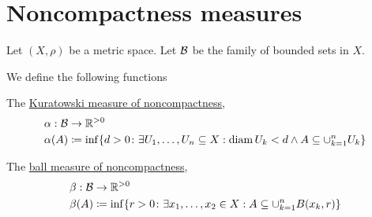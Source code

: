 \section{Noncompactness measures}\label{sec:noncompactness_measures}

Let $(X, \rho)$ be a metric space. Let $\mathcal B$ be the family of bounded sets in $X$.

\begin{definition}\label{def:noncompactness_measures}\cite[definition 7.1]{Deimling1985}
  We define the following functions
  \begin{defenum}
    \item\label{def:noncompactness_measures/sets} The \ul{Kuratowski measure of noncompactness},
    \begin{align*}
      &\alpha: \mathcal B \to \mathbb R^{>0} \\
      &\alpha(A) \coloneqq \inf \{d > 0 \colon \exists U_1, \ldots, U_n \subseteq X: \operatorname{diam} {U_k} < d \land A \subseteq \cup_{k=1}^n U_k \}
    \end{align*}

    \item\label{def:noncompactness_measures/balls} The \ul{ball measure of noncompactness},
    \begin{align*}
      &\beta: \mathcal B \to \mathbb R^{>0} \\
      &\beta(A) \coloneqq \inf \{r > 0 \colon \exists x_1, \ldots, x_2 \in X: A \subseteq \cup_{k=1}^n B(x_k, r) \}
    \end{align*}
  \end{defenum}
\end{definition}

